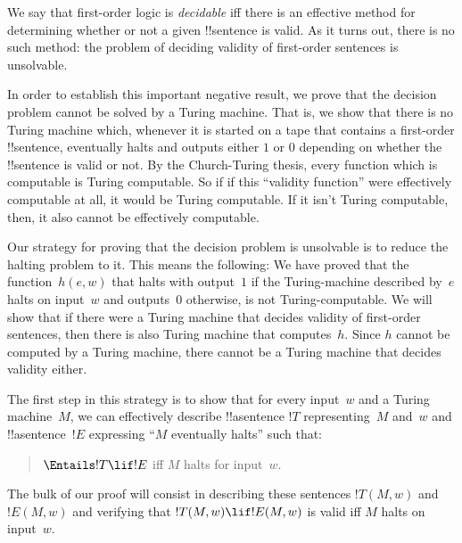 \documentclass[../../../include/open-logic-section]{subfiles}
\begin{document}

We say that first-order logic is \emph{decidable} iff there is an
effective method for determining whether or not a given !!{sentence}
is valid. As it turns out, there is no such method: the problem of
deciding validity of first-order sentences is unsolvable.

In order to establish this important negative result, we prove that
the decision problem cannot be solved by a Turing machine.  That is,
we show that there is no Turing machine which, whenever it is started
on a tape that contains a first-order !!{sentence}, eventually halts
and outputs either $1$ or $0$ depending on whether the
!!{sentence} is valid or not. By the Church-Turing thesis, every
function which is computable is Turing computable. So if if this
``validity function'' were effectively computable at all, it would be
Turing computable. If it isn't Turing computable, then, it also cannot
be effectively computable.

Our strategy for proving that the decision problem is unsolvable is to
reduce the halting problem to it.  This means the following: We have
proved that the function~$h(e,w)$ that halts with output~$1$ if the
Turing-machine described by~$e$ halts on input~$w$ and outputs~$0$
otherwise, is not Turing-computable.  We will show that if there were
a Turing machine that decides validity of first-order sentences, then
there is also Turing machine that computes~$h$.  Since $h$ cannot be
computed by a Turing machine, there cannot be a Turing machine that
decides validity either.

The first step in this strategy is to show that for every input~$w$
and a Turing machine~$M$, we can effectively describe !!a{sentence}
$!T$ representing~$M$ and~$w$ and !!a{sentence}~$!E$ expressing ``$M$
eventually halts'' such that:
\begin{quote}
  $\Entails !T \lif !E$ iff $M$ halts for input~$w$.
\end{quote}
The bulk of our proof will consist in describing these sentences
$!T(M, w)$ and $!E(M, w)$ and verifying that $!T(M, w) \lif !E(M, w)$
is valid iff $M$ halts on input~$w$.
\end{document}
